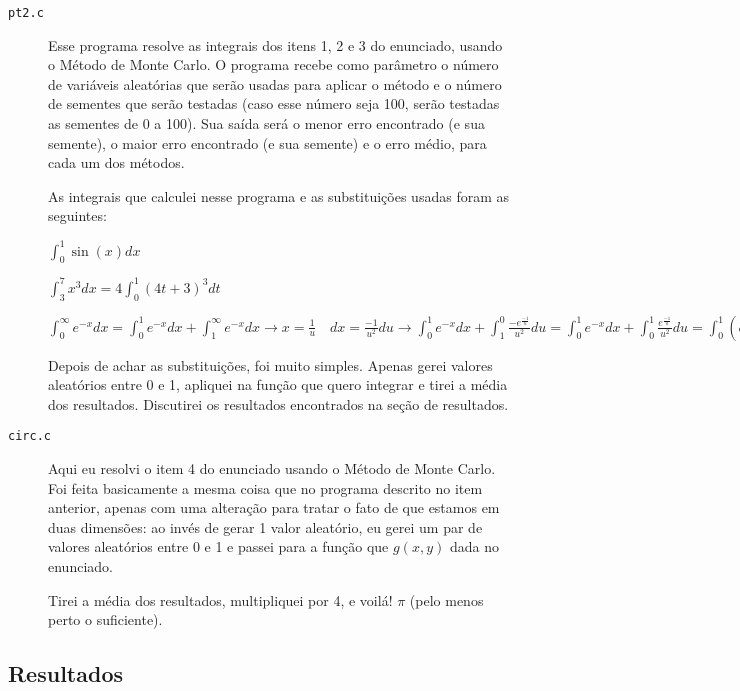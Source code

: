 \documentclass[12pt]{article}
\begin{document}
\begin{description}
  
\item[\texttt{pt2.c}] Esse programa resolve as integrais dos itens 1, 2 e 3 do enunciado, usando o Método de Monte Carlo. O programa recebe como parâmetro o número de variáveis aleatórias que serão usadas para aplicar o método e o número de sementes que serão testadas (caso esse número seja 100, serão testadas as sementes de 0 a 100).
  Sua saída será o menor erro encontrado (e sua semente), o maior erro encontrado (e sua semente) e o erro médio, para cada um dos métodos.

  As integrais que calculei nesse programa e as substituições usadas foram as seguintes:
  
  $\displaystyle\int_0^1\sin{(x)}dx$
  
  $\displaystyle\int_3^7x^3dx = 4\displaystyle\int_0^1(4t+3)^3dt$

  $\displaystyle\int_0^{\infty}e^{-x}dx = \displaystyle\int_0^1e^{-x}dx + \displaystyle\int_1^{\infty}e^{-x}dx \rightarrow x = \frac{1}{u} \quad dx = \frac{-1}{u^2}du \rightarrow \displaystyle\int_0^1e^{-x}dx + \displaystyle\int_1^0\frac{-e^{\frac{-1}{u}}}{u^2}du = \displaystyle\int_0^1e^{-x}dx + \displaystyle\int_0^1\frac{e^{\frac{-1}{u}}}{u^2}du = \displaystyle\int_0^1(e^{-x}+\frac{e^{\frac{-1}{x}}}{x^2})dx$

  Depois de achar as substituições, foi muito simples. Apenas gerei valores aleatórios entre 0 e 1, apliquei na função que quero integrar e tirei a média dos resultados. Discutirei os resultados encontrados na seção de resultados.
  
\item[\texttt{circ.c}] Aqui eu resolvi o item 4 do enunciado usando o Método de Monte Carlo. Foi feita basicamente a mesma coisa que no programa descrito no item anterior, apenas com uma alteração para tratar o fato de que estamos em duas dimensões: ao invés de gerar 1 valor aleatório, eu gerei um par de valores aleatórios entre 0 e 1 e passei para a função que $g(x, y)$ dada no enunciado.

  Tirei a média dos resultados, multipliquei por 4, e voilá! $\pi$ (pelo menos perto o suficiente).
  
\end{description}

\newpage

\subsection{Resultados}
\end{document}
